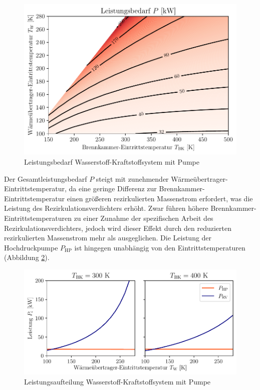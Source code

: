 \begin{figure}[ht]
\centering
\includegraphics[width=0.95\linewidth]{4_Abbildungen/2_Hauptteil/Ergebnisse/Pumpepowercontour.pdf}
  \caption{Leistungsbedarf Wasserstoff-Kraftstoffsystem mit Pumpe}
  \label{fig:pumppower}
\end{figure}
\FloatBarrier

Der Gesamtleistungsbedarf $P$ steigt mit zunehmender Wärmeübertrager-Eintrittstemperatur, da eine geringe Differenz zur Brennkammer-Eintrittstemperatur einen größeren rezirkulierten Massenstrom erfordert, was die Leistung des Rezirkulationsverdichters erhöht. Zwar führen höhere Brennkammer-Eintrittstemperaturen zu einer Zunahme der spezifischen Arbeit des Rezirkulationsverdichters, jedoch wird dieser Effekt durch den reduzierten rezirkulierten Massenstrom mehr als ausgeglichen. Die Leistung der Hochdruckpumpe $P_\mathrm{HP}$ ist hingegen unabhängig von den Eintrittstemperaturen (Abbildung \ref{fig:pumpsplit}). 

\begin{figure}[ht]
\centering
\includegraphics[width=1\linewidth]{4_Abbildungen/2_Hauptteil/Ergebnisse/Pumpe_powersplit.pdf}
  \caption{Leistungsaufteilung Wasserstoff-Kraftstoffsystem mit Pumpe}
  \label{fig:pumpsplit}
\end{figure}
\FloatBarrier

